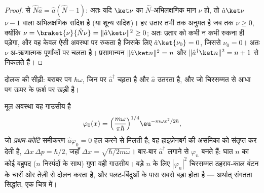 \begin{proof}
 से $\hat N\hat a = \hat a(\hat N - 1)$: अतः यदि
$\ket\nu$ का $\hat N$-अभिलक्षणिक मान $\nu$ हो, तो $\hat a\ket\nu$
$\nu - 1$ वाला अभिलक्षणिक सदिश है (या शून्य सदिश)। हर उतार
तभी तक अनुमत है जब तक $\nu \ge 0$, क्योंकि $\nu = \braket{\nu}{\hat
N\nu} = \|\hat a\ket\nu\|^2 \ge 0$; अतः उतार को कभी न कभी
रुकना ही पड़ेगा, और वह केवल ऐसी अवस्था पर रुकता है जिसके लिए $\hat a\ket{\nu_0}
= 0$, जिससे $\nu_0 = 0$। अतः $\nu$ अ-ऋणात्मक
पूर्णांकों पर चलता है। प्रसामान्यन $\|\hat a\ket n\|^2 = n$
और $\|\hat a^\dagger\ket n\|^2 = n + 1$ से निकलते हैं।
\end{proof}

\begin{omfigure}

{\small दोलक की सीढ़ी: बराबर पग $\hbar\omega$, जिन पर
$\hat a^\dagger$ चढ़ता है और $\hat a$ उतरता है, और जो चिरसम्मत
 से आधा पग ऊपर के फ़र्श पर खड़ी है।}
\end{omfigure}

\begin{proposition}[अवस्थाएँ, दिक् में]\label{prop:b3:harmonic-oscillator:wavefunctions}
मूल अवस्था यह गाउसीय है
\[
\varphi_0(x) = \Big(\frac{m\omega}{\pi\hbar}\Big)^{1/4}
\eu^{-m\omega x^2/2\hbar} ,
\]
जो \emph{प्रथम-कोटि} समीकरण $\hat a\varphi_0
= 0$ हल करने से मिलती है; वह हाइज़ेनबर्ग की असमिका को संतृप्त कर देती
है, $\Delta x\,\Delta p =
\hbar/2$, जहाँ $\Delta x = \sqrt{\hbar/2m\omega}$। बार-बार
$\hat a^\dagger$ लगाने से $\varphi_n$ बनते हैं: घात $n$ का कोई बहुपद
($n$ निस्पंदों के साथ) गुणा वही गाउसीय। बड़े $n$ के लिए
$|\varphi_n|^2$ चिरसम्मत ठहराव-काल बंटन के चारों ओर तेज़ी से दोलन करता
है, और पलट-बिंदुओं के पास सबसे बड़ा होता है --- अर्थात् संगतता
सिद्धांत, एक चित्र में।
\end{proposition}

